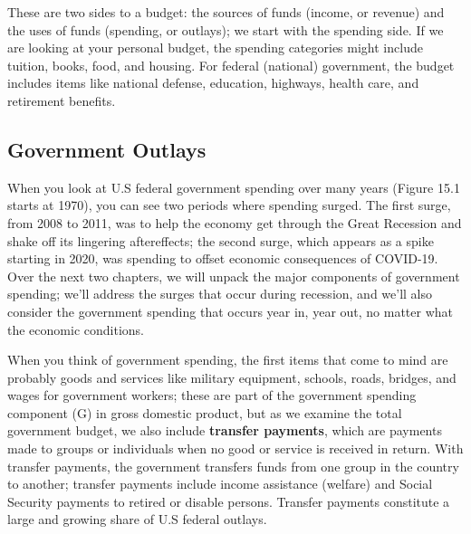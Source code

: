 \documentclass[11pt]{article} %
\begin{document}
These are two sides to a budget: the sources of funds (income, or revenue) and the uses of funds (spending, or outlays); we start with the spending side. If we are looking at your personal budget, the spending categories might include tuition, books, food, and housing. For federal (national) government, the budget includes items like national defense, education, highways, health care, and retirement benefits.

\subsection*{Government Outlays}
When you look at U.S federal government spending over many years (Figure 15.1 starts at 1970), you can see two periods where spending surged. The first surge, from 2008 to 2011, was to help the economy get through the Great Recession and shake off its lingering aftereffects; the second surge, which appears as a spike starting in 2020, was spending to offset economic consequences of COVID-19. Over the next two chapters, we will unpack the major components of government spending; we'll address the surges that occur during recession, and we'll also consider the government spending that occurs year in, year out, no matter what the economic conditions.

When you think of government spending, the first items that come to mind are probably goods and services like military equipment, schools, roads, bridges, and wages for government workers; these are part of the government spending component (G) in gross domestic product, but as we examine the total government budget, we also include \textbf{transfer payments}, which are payments made to groups or individuals when no good or service is received in return. With transfer payments, the government transfers funds from one group in the country to another; transfer payments include income assistance (welfare) and Social Security payments to retired or disable persons. Transfer payments constitute a large and growing share of U.S federal outlays.
\end{document}
